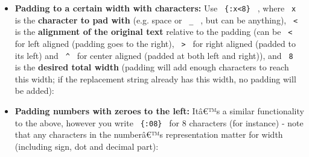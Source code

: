 \begin{itemize}
\tightlist
\item
  \textbf{Padding to a certain width with characters:} Use
  \texttt{\ \{:x\textless{}8\}\ } , where \texttt{\ x\ } is the
  \textbf{character to pad with} (e.g. space or \texttt{\ \_\ } , but
  can be anything), \texttt{\ \textless{}\ } is the \textbf{alignment of
  the original text} relative to the padding (can be
  \texttt{\ \textless{}\ } for left aligned (padding goes to the right),
  \texttt{\ \textgreater{}\ } for right aligned (padded to its left) and
  \texttt{\ \^{}\ } for center aligned (padded at both left and right)),
  and \texttt{\ 8\ } is the \textbf{desired total width} (padding will
  add enough characters to reach this width; if the replacement string
  already has this width, no padding will be added):
\end{itemize}

\begin{Shaded}
\begin{Highlighting}[]

\end{Highlighting}
\end{Shaded}

\begin{itemize}
\tightlist
\item
  \textbf{Padding numbers with zeroes to the left:} Itâ€™s a similar
  functionality to the above, however you write \texttt{\ \{:08\}\ } for
  8 characters (for instance) - note that any characters in the
  numberâ€™s representation matter for width (including sign, dot and
  decimal part):
\end{itemize}

\begin{Shaded}
\begin{Highlighting}[]

\end{Highlighting}
\end{Shaded}

